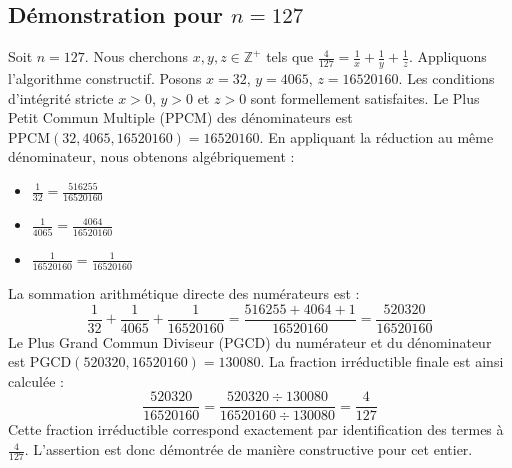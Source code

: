\documentclass[11pt,a4paper]{article}
\begin{document}
\subsection{Démonstration pour $n = 127$}
Soit $n = 127$. Nous cherchons $x, y, z \in \mathbb{Z}^{+}$ tels que $\frac{4}{127} = \frac{1}{x} + \frac{1}{y} + \frac{1}{z}$.
Appliquons l'algorithme constructif. Posons $x = 32$, $y = 4065$, $z = 16520160$.
Les conditions d'intégrité stricte $x > 0$, $y > 0$ et $z > 0$ sont formellement satisfaites.
Le Plus Petit Commun Multiple (PPCM) des dénominateurs est $\text{PPCM}(32, 4065, 16520160) = 16520160$.
En appliquant la réduction au même dénominateur, nous obtenons algébriquement :
\begin{itemize}
    \item $\frac{1}{32} = \frac{516255}{16520160}$
    \item $\frac{1}{4065} = \frac{4064}{16520160}$
    \item $\frac{1}{16520160} = \frac{1}{16520160}$
\end{itemize}
La sommation arithmétique directe des numérateurs est :
$$ \frac{1}{32} + \frac{1}{4065} + \frac{1}{16520160} = \frac{516255 + 4064 + 1}{16520160} = \frac{520320}{16520160} $$
Le Plus Grand Commun Diviseur (PGCD) du numérateur et du dénominateur est $\text{PGCD}(520320, 16520160) = 130080$.
La fraction irréductible finale est ainsi calculée :
$$ \frac{520320}{16520160} = \frac{520320 \div 130080}{16520160 \div 130080} = \frac{4}{127} $$
Cette fraction irréductible correspond exactement par identification des termes à $\frac{4}{127}$. L'assertion est donc démontrée de manière constructive pour cet entier.
\end{document}
